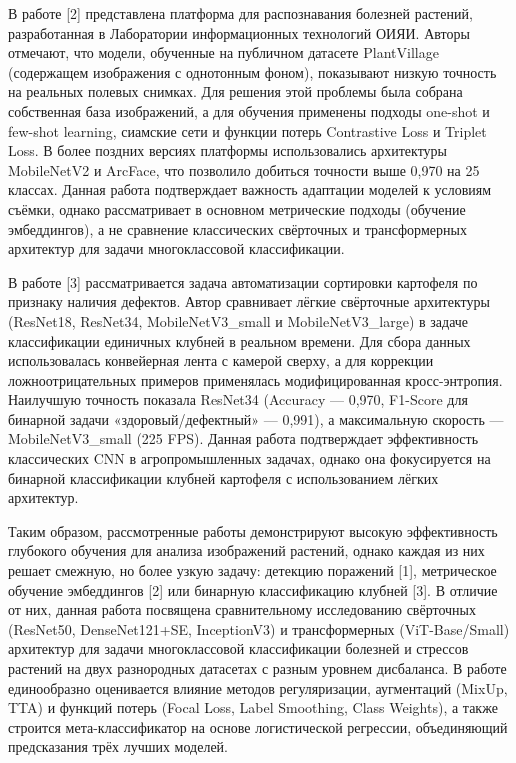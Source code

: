 \documentclass{misisarticle}
\begin{document}
В работе [2] представлена платформа для распознавания болезней растений, разработанная в Лаборатории информационных технологий ОИЯИ. Авторы отмечают, что модели, обученные на публичном датасете PlantVillage (содержащем изображения с однотонным фоном), показывают низкую точность на реальных полевых снимках. Для решения этой проблемы была собрана собственная база изображений, а для обучения применены подходы one-shot и few-shot learning, сиамские сети и функции потерь Contrastive Loss и Triplet Loss. В более поздних версиях платформы использовались архитектуры MobileNetV2 и ArcFace, что позволило добиться точности выше 0,970 на 25 классах. Данная работа подтверждает важность адаптации моделей к условиям съёмки, однако рассматривает в основном метрические подходы (обучение эмбеддингов), а не сравнение классических свёрточных и трансформерных архитектур для задачи многоклассовой классификации.

В работе [3] рассматривается задача автоматизации сортировки картофеля по признаку наличия дефектов. Автор сравнивает лёгкие свёрточные архитектуры (ResNet18, ResNet34, MobileNetV3\_small и MobileNetV3\_large) в задаче классификации единичных клубней в реальном времени. Для сбора данных использовалась конвейерная лента с камерой сверху, а для коррекции ложноотрицательных примеров применялась модифицированная кросс-энтропия. Наилучшую точность показала ResNet34 (Accuracy — 0,970, F1-Score для бинарной задачи «здоровый/дефектный» — 0,991), а максимальную скорость — MobileNetV3\_small (225 FPS). Данная работа подтверждает эффективность классических CNN в агропромышленных задачах, однако она фокусируется на бинарной классификации клубней картофеля с использованием лёгких архитектур.

Таким образом, рассмотренные работы демонстрируют высокую эффективность глубокого обучения для анализа изображений растений, однако каждая из них решает смежную, но более узкую задачу: детекцию поражений [1], метрическое обучение эмбеддингов [2] или бинарную классификацию клубней [3]. В отличие от них, данная работа посвящена сравнительному исследованию свёрточных (ResNet50, DenseNet121+SE, InceptionV3) и трансформерных (ViT-Base/Small) архитектур для задачи многоклассовой классификации болезней и стрессов растений на двух разнородных датасетах с разным уровнем дисбаланса. В работе единообразно оценивается влияние методов регуляризации, аугментаций (MixUp, TTA) и функций потерь (Focal Loss, Label Smoothing, Class Weights), а также строится мета-классификатор на основе логистической регрессии, объединяющий предсказания трёх лучших моделей.
\end{document}
